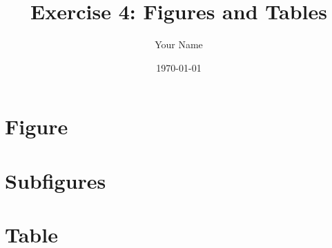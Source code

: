 \documentclass{article}
\title{Exercise 4: Figures and Tables}
\author{Your Name}
\date{\today}
\begin{document}
\maketitle

\section{Figure}

\section{Subfigures}

\section{Table}
\end{document}
